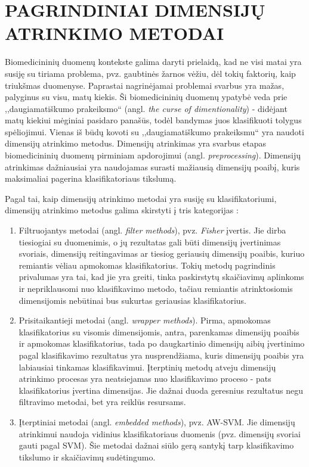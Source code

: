 \section{PAGRINDINIAI DIMENSIJŲ ATRINKIMO METODAI}

Biomedicininių duomenų kontekste galima daryti prielaidą, kad ne visi matai yra susiję su tiriama problema, pvz. gaubtinės žarnos vėžiu, dėl tokių faktorių, kaip triukšmas duomenyse. Paprastai nagrinėjamai problemai svarbus yra mažas, palyginus su visu, matų kiekis. Ši biomedicininių duomenų ypatybė veda prie ,,daugiamatiškumo prakeiksmo`` (angl. \textit{the curse of dimentionality}) \cite{bellman1966adaptive} - didėjant matų kiekiui mėginiai pasidaro panašūs, todėl bandymas juos klasifikuoti tolygus spėliojimui. Vienas iš būdų kovoti su ,,daugiamatiškumo prakeiksmu`` yra naudoti dimensijų atrinkimo metodus. Dimensijų atrinkimas yra svarbus etapas biomedicininių duomenų pirminiam apdorojimui (angl. \textit{preprocessing}). Dimensijų atrinkimas dažniausiai yra naudojamas surasti mažiausią dimensijų poaibį, kuris maksimaliai pagerina klasifikatoriaus tikslumą.

Pagal tai, kaip dimensijų atrinkimo metodai yra susiję su klasifikatoriumi, dimensijų atrinkimo metodus galima skirstyti į tris kategorijas \cite{saeys2008robust}:
\begin{enumerate}
 \item Filtruojantys metodai (angl. \textit{filter methods}), pvz. \textit{Fisher} įvertis. Jie dirba tiesiogiai su duomenimis, o jų rezultatas gali būti dimensijų įvertinimas svoriais, dimensijų reitingavimas ar tiesiog geriausių dimensijų poaibis, kuriuo remiantis vėliau apmokomas klasifikatorius. Tokių metodų pagrindinis privalumas yra tai, kad jie yra greiti, tinka paskirstytų skaičiavimų aplinkoms ir nepriklausomi nuo klasifikavimo  metodo, tačiau remiantis atrinktosiomis dimensijomis nebūtinai bus sukurtas geriausias klasifikatorius.
 \item Prisitaikantieji metodai (angl. \textit{wrapper methods}). Pirma, apmokomas klasifikatorius su visomis dimensijomis, antra, parenkamas dimensijų poaibis ir apmokomas klasifikatorius, tada po daugkartinio dimensijų aibių įvertinimo pagal klasifikavimo rezultatus yra nusprendžiama, kuris dimensijų poaibis yra labiausiai tinkamas klasifikavimui. Įterptinių metodų atveju dimensijų atrinkimo procesas yra neatsiejamas nuo klasifikavimo proceso - pats klasifikatorius įvertina dimensijas. Jie dažnai duoda geresnius rezultatus negu filtravimo metodai, bet yra reiklūs resursams.
 \item Įterptiniai metodai (angl. \textit{embedded methods}), pvz. AW-SVM\cite{vapnik2000nature}. Jie dimensijų atrinkimui naudoja vidinius klasifikatoriaus duomenis (pvz. dimensijų svoriai gauti pagal SVM). Šie metodai dažnai siūlo gerą santykį tarp klasifikavimo tikslumo ir skaičiavimų sudėtingumo.
\end{enumerate}

